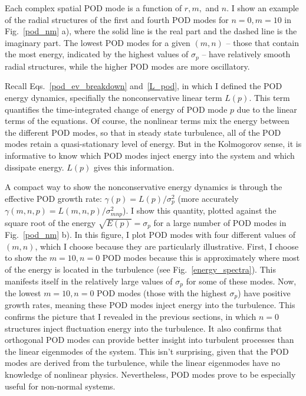 Each complex spatial POD mode is a function of $r, m,$ and $n$. I show an example of the radial structures of the first and fourth POD modes for $n=0,m=10$ in Fig.~\ref{pod_nm} a), where the solid line
is the real part and the dashed line is the imaginary part. The lowest POD modes for a given $(m,n)$ -- those that contain the most energy, indicated by the highest values of $\sigma_p$ -- 
have relatively smooth radial structures, while the higher POD modes are more oscillatory.

Recall Eqs.~\ref{pod_ev_breakdown} and~\ref{L_pod}, in which I defined the POD energy dynamics, specifially the nonconservative linear term $L(p)$. This term quantifies the time-integrated
change of energy of POD mode $p$ due to the linear terms of the equations. Of course, the nonlinear terms mix the energy between the different POD modes, so that in steady state turbulence,
all of the POD modes retain a quasi-stationary level of energy. But in the Kolmogorov sense, it is informative to know which POD modes inject energy into the system and which dissipate energy.
$L(p)$ gives this information. 

A compact way to show the nonconservative energy dynamics is through the effective POD growth rate: $\gamma(p) = L(p)/\sigma_p^2$ (more accurately $\gamma(m,n,p) = L(m,n,p)/\sigma_{mnp}^2$). 
I show this quantity, plotted against the square root of the energy $\sqrt{E(p)} = \sigma_p$
for a large number of POD modes in Fig.~\ref{pod_nm} b). In this figure, I plot POD modes with four different values of $(m,n)$, which I choose because they are particularly illustrative.
First, I choose to show the $m=10, n=0$ POD modes because this is approximately where most of the energy is located in the turbulence (see Fig.~\ref{energy_spectra}).
This manifests itself in the relatively large values of $\sigma_p$ for some of these modes. Now, the lowest $m=10, n=0$ POD modes (those with the highest $\sigma_p$)
have positive growth rates, meaning these POD modes inject energy into the turbulence. This confirms the picture that I revealed in the previous sections, in which $n=0$ structures
inject fluctuation energy into the turbulence. It also confirms
that orthogonal POD modes can provide better insight into turbulent processes than the linear eigenmodes of the system. This isn't surprising, given that the POD modes are derived from the turbulence,
while the linear eigenmodes have no knowledge of nonlinear physics. Nevertheless, POD modes prove to be especially useful for non-normal systems.


